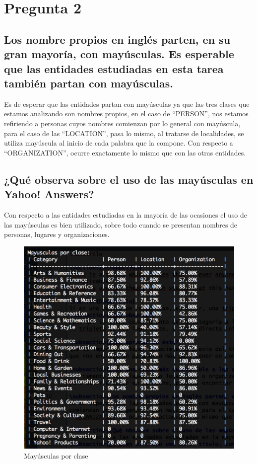 \documentclass{article}
\begin{document}
\section{Pregunta 2}
\subsection{Los nombre propios en inglés parten, en su gran mayoría, con mayúsculas. Es esperable que las entidades estudiadas en esta tarea también partan con mayúsculas.}
Es de esperar que las entidades partan con mayúsculas ya que las tres clases que estamos analizando son nombres propios, en el caso de ``PERSON'', nos estamos refiriendo a personas cuyos nombres comienzan por lo general con mayúscula, para el caso de las ``LOCATION'', pasa lo mismo, al tratarse de localidades, se utiliza mayúscula al inicio de cada palabra que la compone. Con respecto a ``ORGANIZATION'', ocurre exactamente lo mismo que con las otras entidades.

\subsection{¿Qué observa sobre el uso de las mayúsculas en Yahoo! Answers?}
Con respecto a las entidades estudiadas en la mayoría de las ocasiones el uso de las mayúsculas es bien utilizado, sobre todo cuando se presentan nombres de personas, lugares y organizaciones.
\begin{figure}[h!]
\centering
\includegraphics[scale=0.5]{figuras/mayusculas.png}
\caption{Mayúsculas por clase}
\label{fig:mayusculas}
\end{figure}
\end{document}
